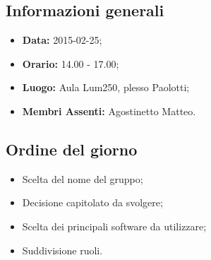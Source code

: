 \subsection{Informazioni generali}
\begin{itemize}
	\item \textbf{Data:} 2015-02-25;
	\item \textbf{Orario:} 14.00 - 17.00;
	\item \textbf{Luogo:} Aula Lum250, plesso Paolotti;
	\item \textbf{Membri Assenti:} Agostinetto Matteo.
\end{itemize}

\subsection{Ordine del giorno}
\begin{itemize}
	\item Scelta del nome del gruppo;
	\item Decisione capitolato da svolgere;
	\item Scelta dei principali software da utilizzare;
	\item Suddivisione ruoli.
\end{itemize}







